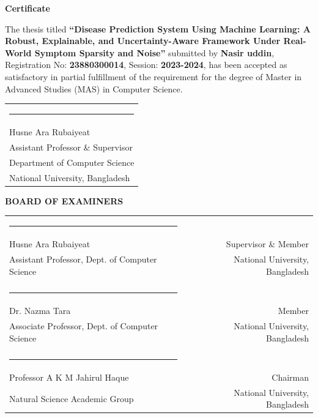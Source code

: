 {\noindent\LARGE\bfseries Certificate\par}
\vspace{0.8in}

\noindent The thesis titled \textbf{``Disease Prediction System Using Machine Learning: A Robust, Explainable, and Uncertainty-Aware Framework Under Real-World Symptom Sparsity and Noise''} submitted by \textbf{Nasir uddin}, Registration No: \textbf{23880300014}, Session: \textbf{2023-2024}, has been accepted as satisfactory in partial fulfillment of the requirement for the degree of Master in Advanced Studies (MAS) in Computer Science.

\vspace{0.8in}

\noindent \begin{tabular}{l}
  \rule{6cm}{0.5pt} \\
  Husne Ara Rubaiyeat\\
  Assistant Professor \& Supervisor\\
  Department of Computer Science\\
  National University, Bangladesh\\
\end{tabular}

\vspace{0.8in}

\begin{center}
   \textbf{BOARD OF EXAMINERS}
\end{center}
\vspace{0.3in}
\noindent \begin{tabular}{lp{1cm}r}
  \rule{5.5cm}{0.5pt}&\\
  Husne Ara Rubaiyeat & & Supervisor \& Member \\
  Assistant Professor, Dept. of Computer Science & & National University, Bangladesh \\
  & & \\
  \rule{5.5cm}{0.5pt}&\\
  Dr. Nazma Tara & & Member \\
  Associate Professor, Dept. of Computer Science & & National University, Bangladesh \\
  & & \\
  \rule{5.5cm}{0.5pt}&\\
  Professor A K M Jahirul Haque & & Chairman \\
  Natural Science Academic Group & & National University, Bangladesh \\
\end{tabular}
